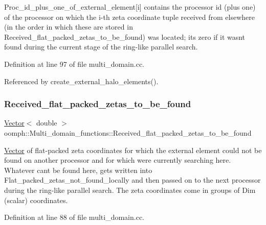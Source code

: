 Proc\+\_\+id\+\_\+plus\+\_\+one\+\_\+of\+\_\+external\+\_\+element\mbox{[}i\mbox{]} contains the processor id (plus one) of the processor on which the i-\/th zeta coordinate tuple received from elsewhere (in the order in which these are stored in Received\+\_\+flat\+\_\+packed\+\_\+zetas\+\_\+to\+\_\+be\+\_\+found) was located; it\textquotesingle{}s zero if it wasn\textquotesingle{}t found during the current stage of the ring-\/like parallel search. 



Definition at line 97 of file multi\+\_\+domain.\+cc.



Referenced by create\+\_\+external\+\_\+halo\+\_\+elements().

\mbox{\label{namespaceoomph_1_1Multi__domain__functions_aa5bb8d568feb34660caf8f88928f3be7}} 
\subsubsection{\texorpdfstring{Received\+\_\+flat\+\_\+packed\+\_\+zetas\+\_\+to\+\_\+be\+\_\+found}{Received\_flat\_packed\_zetas\_to\_be\_found}}
{\footnotesize\ttfamily \hyperlink{classoomph_1_1Vector}{Vector}$<$ double $>$ oomph\+::\+Multi\+\_\+domain\+\_\+functions\+::\+Received\+\_\+flat\+\_\+packed\+\_\+zetas\+\_\+to\+\_\+be\+\_\+found}



\hyperlink{classoomph_1_1Vector}{Vector} of flat-\/packed zeta coordinates for which the external element could not be found on another processor and for which we\textquotesingle{}re currently searching here. Whatever can\textquotesingle{}t be found here, gets written into Flat\+\_\+packed\+\_\+zetas\+\_\+not\+\_\+found\+\_\+locally and then passed on to the next processor during the ring-\/like parallel search. The zeta coordinates come in groups of Dim (scalar) coordinates. 



Definition at line 88 of file multi\+\_\+domain.\+cc.

